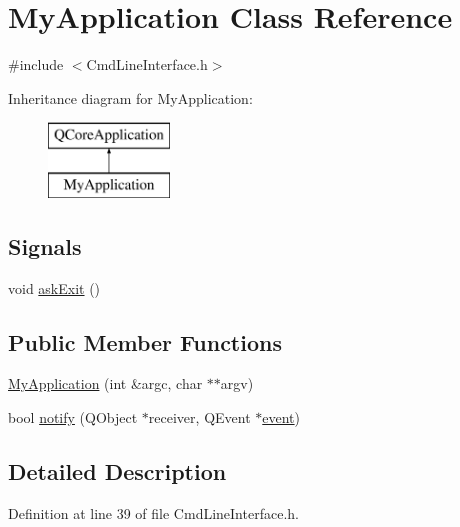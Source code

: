 \hypertarget{class_my_application}{}\section{My\+Application Class Reference}
\label{class_my_application}


{\ttfamily \#include $<$Cmd\+Line\+Interface.\+h$>$}

Inheritance diagram for My\+Application\+:\begin{figure}[H]
\begin{center}
\leavevmode
\includegraphics[height=2.000000cm]{class_my_application}
\end{center}
\end{figure}
\subsection*{Signals}
\begin{DoxyCompactItemize}
\item 
void \hyperlink{class_my_application_acd488def3bf98b1ad2b7ab71507d74b5}{ask\+Exit} ()
\end{DoxyCompactItemize}
\subsection*{Public Member Functions}
\begin{DoxyCompactItemize}
\item 
\hyperlink{class_my_application_a4b9e70ce40a83d5d4ae99253a6933c02}{My\+Application} (int \&argc, char $\ast$$\ast$argv)
\item 
bool \hyperlink{class_my_application_af89ced7a59b1930e7a39abb6c17cd33a}{notify} (Q\+Object $\ast$receiver, Q\+Event $\ast$\hyperlink{pkcs11t_8h_afaa077e4b9760c92cbaf0d838e743d8c}{event})
\end{DoxyCompactItemize}


\subsection{Detailed Description}


Definition at line 39 of file Cmd\+Line\+Interface.\+h.



